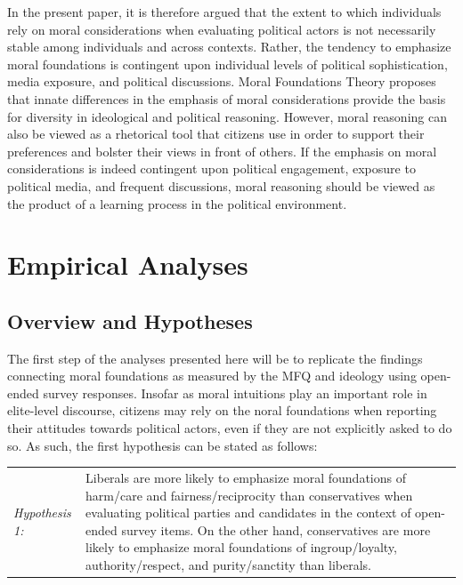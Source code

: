 \documentclass[12pt]{article}
\begin{document}
In the present paper, it is therefore argued that the extent to which individuals rely on moral considerations when evaluating political actors is not necessarily stable among individuals and across contexts. Rather, the tendency to emphasize moral foundations is contingent upon individual levels of political sophistication, media exposure, and political discussions. Moral Foundations Theory proposes that innate differences in the emphasis of moral considerations provide the basis for diversity in ideological and political reasoning. However, moral reasoning can also be viewed as a rhetorical tool that citizens use in order to support their preferences and bolster their views in front of others. If the emphasis on moral considerations is indeed contingent upon political engagement, exposure to political media, and frequent discussions, moral reasoning should be viewed as the product of a learning process in the political environment.


\section{Empirical Analyses}

\subsection{Overview and Hypotheses}

The first step of the analyses presented here will be to replicate the findings connecting moral foundations as measured by the MFQ and ideology using open-ended survey responses. Insofar as moral intuitions play an important role in elite-level discourse, citizens may rely on the noral foundations when reporting their attitudes towards political actors, even if they are not explicitly asked to do so. As such, the first hypothesis can be stated as follows:

\vspace{0.3cm}
\begin{tabular}{lp{12cm}}
\textsl{Hypothesis 1:} & Liberals are more likely to emphasize moral foundations of harm/care and fairness/reciprocity  than conservatives when evaluating political parties and candidates in the context of open-ended survey items. On the other hand, conservatives are more likely to emphasize moral foundations of ingroup/loyalty, authority/respect, and purity/sanctity than liberals.
\end{tabular}
\vspace{0.5cm}
\end{document}
